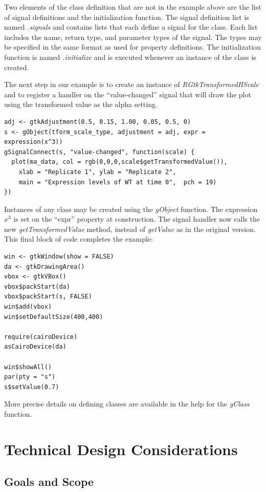 \documentclass[article]{jss}
\begin{document}
Two elements of the class definition that are not in the example above are
the list of signal definitions and the initialization function.
The signal definition list is named \emph{.signals} and contains lists that each
define a signal for the class. Each list includes the name, return type, and
parameter types of the signal. The types may be specified in the
same format as used for property definitions. The initialization function is named
\emph{.initialize} and is executed whenever an instance of the class is created.

The next step in our example is to create an instance
of \emph{RGtkTransformedHScale} and to register a handler on the 
``value-changed'' signal that will draw the plot using the transformed value as 
the alpha setting.
\begin{verbatim}
adj <- gtkAdjustment(0.5, 0.15, 1.00, 0.05, 0.5, 0)
s <- gObject(tform_scale_type, adjustment = adj, expr = expression(x^3))
gSignalConnect(s, "value-changed", function(scale) {
  plot(ma_data, col = rgb(0,0,0,scale$getTransformedValue()),
    xlab = "Replicate 1", ylab = "Replicate 2", 
    main = "Expression levels of WT at time 0",  pch = 19)
})
\end{verbatim}
Instances of any  class may be created using the \emph{gObject} function.
The expression $x^3$ is set on the ``expr'' property at construction. The
signal handler now calls the new \emph{getTransformedValue} method, instead
of \emph{getValue} as in the original version. This final block of code
completes the example:
\begin{verbatim}
win <- gtkWindow(show = FALSE)
da <- gtkDrawingArea()
vbox <- gtkVBox()
vbox$packStart(da)
vbox$packStart(s, FALSE)
win$add(vbox)
win$setDefaultSize(400,400)

require(cairoDevice)
asCairoDevice(da)

win$showAll()
par(pty = "s")
s$setValue(0.7)
\end{verbatim}

More precise details on defining  classes are available in the 
 help for the \emph{gClass} function.

\section{Technical Design Considerations}

\subsection{Goals and Scope}
\end{document}

